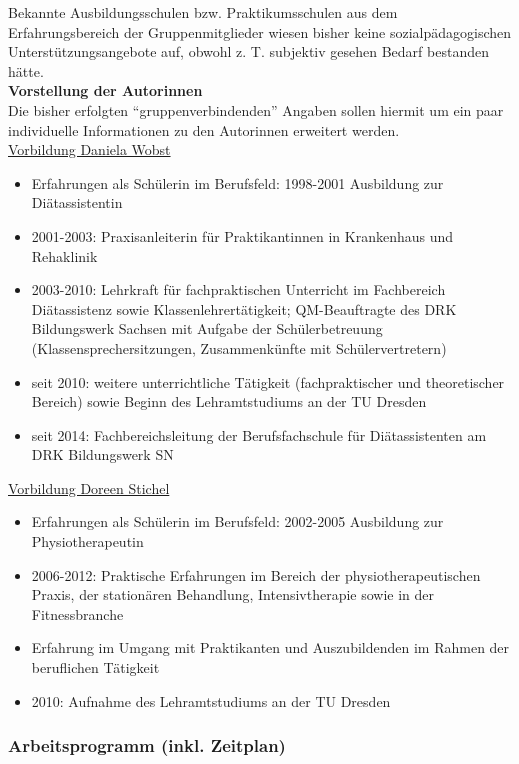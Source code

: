 Bekannte Ausbildungsschulen bzw. Praktikumsschulen aus dem Erfahrungsbereich der Gruppenmitglieder wiesen bisher keine sozialpädagogischen Unterstützungsangebote auf, obwohl z. T. subjektiv gesehen Bedarf bestanden hätte.\\

\newpage
\noindent
\textbf{Vorstellung der Autorinnen}\\

\noindent
Die bisher erfolgten "`gruppenverbindenden"' Angaben sollen hiermit um ein paar individuelle Informationen zu den Autorinnen erweitert werden.\\

\noindent
\underline{Vorbildung Daniela Wobst}
\begin{itemize}
	\item Erfahrungen als Schülerin im Berufsfeld: 1998-2001 Ausbildung zur Diätassistentin
	\item 2001-2003: Praxisanleiterin für Praktikantinnen in Krankenhaus und Rehaklinik
	\item 2003-2010: Lehrkraft für fachpraktischen Unterricht im Fachbereich Diätassistenz sowie Klassenlehrertätigkeit; QM-Beauftragte des DRK Bildungswerk Sachsen mit Aufgabe der Schülerbetreuung (Klassensprechersitzungen, Zusammenkünfte mit Schülervertretern)
	\item seit 2010: weitere unterrichtliche Tätigkeit (fachpraktischer und theoretischer Bereich) sowie Beginn des Lehramtstudiums an der TU Dresden
	\item seit 2014: Fachbereichsleitung der Berufsfachschule für Diätassistenten am DRK Bildungswerk SN
\end{itemize}

\noindent
\underline{Vorbildung Doreen Stichel}
\begin{itemize}
	\item Erfahrungen als Schülerin im Berufsfeld: 2002-2005 Ausbildung zur Physiotherapeutin
	\item 2006-2012: Praktische Erfahrungen im Bereich der physiotherapeutischen Praxis, der stationären Behandlung, Intensivtherapie sowie in der Fitnessbranche
	\item Erfahrung im Umgang mit Praktikanten und Auszubildenden im Rahmen der beruflichen Tätigkeit
	\item 2010: Aufnahme des Lehramtstudiums an der TU Dresden
\end{itemize}

\newpage
\subsubsection{Arbeitsprogramm (inkl. Zeitplan)}
\label{sec:ArbeitsprogrammInklZeitplan}

